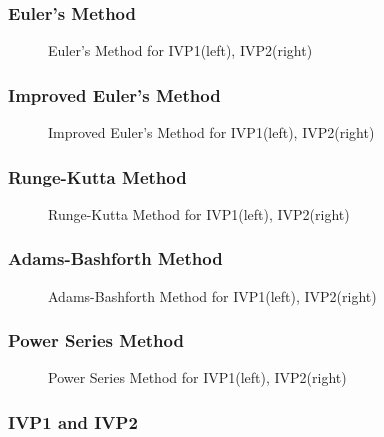 \documentclass[UTF8]{beamer}
\begin{document}

\begin{frame}
\frametitle{Euler's Method}
	\begin{figure}
		\centering
		\scalebox{0.45}{}
		\caption{Euler's Method for IVP1(left), IVP2(right)}
	\end{figure}
\end{frame}	

\begin{frame}
	\frametitle{Improved Euler's Method}
	\begin{figure}
		\centering
		\scalebox{0.45}{}
		\caption{Improved Euler's Method for IVP1(left), IVP2(right)}
	\end{figure}
\end{frame}	

\begin{frame}
	\frametitle{Runge-Kutta Method}
	\begin{figure}
		\centering
		\scalebox{0.45}{}
		\caption{Runge-Kutta Method for IVP1(left), IVP2(right)}
	\end{figure}
\end{frame}

\begin{frame}
	\frametitle{Adams-Bashforth Method}
	\begin{figure}
		\centering
		\scalebox{0.45}{}
		\caption{Adams-Bashforth Method for IVP1(left), IVP2(right)}
	\end{figure}
\end{frame}
\begin{frame}
	\frametitle{Power Series Method}
	\begin{figure}
		\centering
		\scalebox{0.45}{}
		\caption{Power Series Method for IVP1(left), IVP2(right)}
	\end{figure}
\end{frame}
\begin{frame}[allowframebreaks]
	\frametitle{IVP1 and IVP2}
	\begin{figure}
		\centering
		\scalebox{0.6}{}
		\scalebox{0.6}{}
	\end{figure}
\end{frame}
\end{document}
